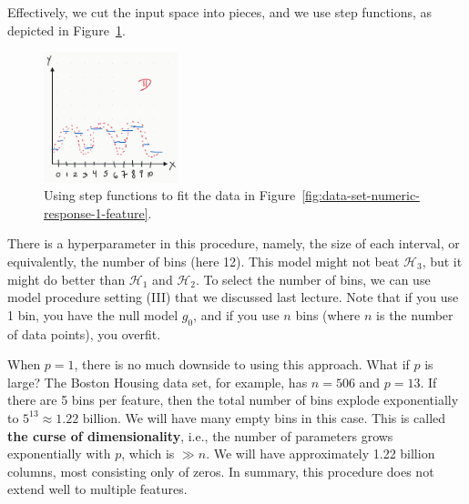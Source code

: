 \documentclass[12pt, a4paper]{article}
\theoremstyle{definition}
\begin{document}
	Effectively, we cut the input space into pieces, and we use step functions,
	as depicted in Figure~\ref{fig:data-set-numeric-response-1-feature-step}.
	\begin{figure}
		\centering
		\includegraphics[width=0.35\textwidth]{data-set-numeric-response-1-feature-step}
		\caption{Using step functions to fit the data in
		Figure~\ref{fig:data-set-numeric-response-1-feature}.}
		\label{fig:data-set-numeric-response-1-feature-step}
	\end{figure}
	There is a hyperparameter in this procedure, namely, the size of each interval,
	or equivalently, the number of bins (here 12). This model might not beat
	$\mathcal{H}_3$, but it might do better than $\mathcal{H}_1$ and $\mathcal{H}_2$.
	To select the number of bins, we can use model procedure setting (III) that we discussed
	last lecture. Note that if you use 1 bin, you have the null model $g_0$,
	and if you use $n$ bins (where $n$ is the number of data points), you overfit.
	
	When $p = 1$, there is no much downside to using this approach. What if $p$ is large?
	The Boston Housing data set, for example, has $n = 506$ and $p = 13$. If there
	are 5 bins per feature, then the total number of bins explode exponentially
	to $5^{13}\approx 1.22 \text{ billion}$. We will have many empty bins in this
	case. This is called \textbf{the curse of dimensionality}, i.e., the number
	of parameters grows exponentially with $p$, which is $\gg n$. We will have
	approximately 1.22 billion columns, most consisting only of zeros. In summary,
	this procedure does not extend well to multiple features.
	
\end{document}
